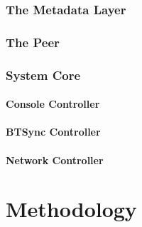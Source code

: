 \documentclass[12pt]{report}
\begin{document}

\subsection{The Metadata Layer}



\subsection{The Peer}


\subsection{System Core}


\subsubsection{Console Controller}


\subsubsection{BTSync Controller}


\subsubsection{Network Controller}


\chapter{Methodology}
\end{document}
